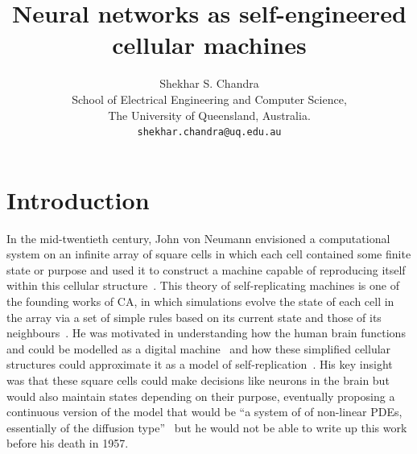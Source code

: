 \documentclass[11pt]{article}
\title{Neural networks as self-engineered cellular machines}
\author{Shekhar S. Chandra\\
	School of Electrical Engineering and Computer Science,\\
	The University of Queensland, Australia.\\
	\texttt{shekhar.chandra@uq.edu.au} }
\begin{document}
\maketitle

\begin{abstract}
	
\end{abstract}
	
\section{Introduction}\label{sec::Introduction}

In the mid-twentieth century, John von Neumann envisioned a computational system on an infinite array of square cells in which each cell contained some finite state or purpose and used it to construct a machine capable of reproducing itself within this cellular structure~\citep[published post-humorously]{von_neumann_theory_1966}. This theory of self-replicating machines is one of the founding works of \ac{CA}, in which simulations evolve the state of each cell in the array via a set of simple rules based on its current state and those of its neighbours~\citep{sipper_fifty_1998}. He was motivated in understanding how the human brain functions and could be modelled as a digital machine~\citep[pg. 43]{neumann_computer_1958} and how these simplified cellular structures could approximate it as a model of self-replication~\citep[pg. 93]{von_neumann_theory_1966}. His key insight was that these square cells could make decisions like neurons in the brain but would also maintain states depending on their purpose, eventually proposing a continuous version of the model that would be ``a system of of non-linear PDEs, essentially of the diffusion type''~\citep[pg. 95]{von_neumann_theory_1966} but he would not be able to write up this work before his death in 1957.
\end{document}

